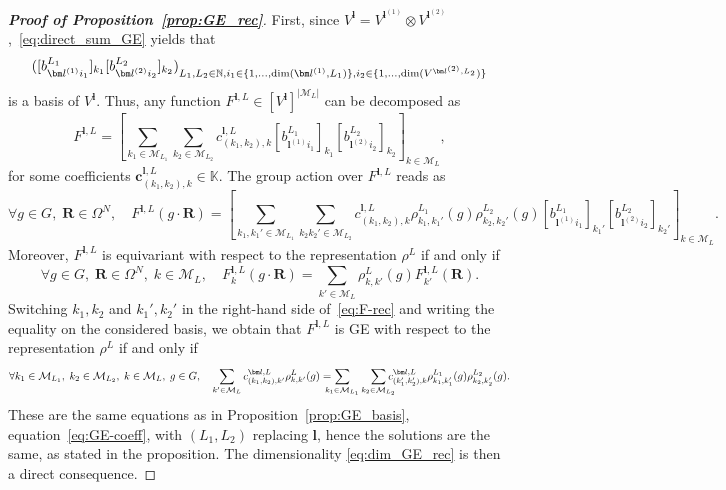 \documentclass{article}
\newcommand{\rep}[2]{\rho^{#1}_{#2}}
\newcommand{\card}[1]{|{#1}|}
\newcommand{\dimge}[2]{\dim(V^{#1,#2})}
\numberwithin{equation}{section}
\def\N{\mathbb{N}}
\def\K{\mathbb{K}}
\def\bc{{\bm c}}
\def\bl{{\bm l}}
\def\bR{{\bm R}}
\def\calM{\mathcal{M}}
\def\Nat{{N}}
\def\dim{{{\rm dim}}}
\begin{document}
\begin{proof}[\bf{Proof of Proposition~\ref{prop:GE_rec}}]
First, since $V^\bl = V^{\bl^{(1)}} \otimes V^{\bl^{(2)}}$,~\eqref{eq:direct_sum_GE} yields that
\[ 
([b^{L_1}_{\bl^{(1)} i_1}]_{k_1} [b^{L_2}_{\bl^{(2)} i_2}]_{k_2})_{L_1,L_2 \in \N, i_1 \in \{ 1, \ldots, \dim{}{}(\bl^{(1)},L_1)\}, i_2 \in \{1, \ldots, \dimge{\bl^{(2)}}{L_2}\} }
\]
is a basis of $V^\bl$. Thus, 
any function $F^{\bl,L}\in [V^\bl]^{\card{\calM_L}}$ can be decomposed as 
\[
F^{\bl,L}
   = \left[ \sum_{k_1 \in \calM_{L_1}} \sum_{k_2 \in \calM_{L_2}}
    c^{\bl,L}_{(k_1,k_2), k}
    [b^{L_1}_{\bl^{(1)} i_1}]_{k_1} [b^{L_2}_{\bl^{(2)} i_2}]_{k_2} \right]_{k\in \calM_L},
\]
for some coefficients $\bc^{\bl,L}_{(k_1,k_2), k} \in \K$.
The group action over $F^{\bl,L}$ reads as 
\begin{equation}\label{eq:F-rec}
   \forall g\in G, \; \bR\in \Omega^\Nat, \quad F^{\bl,L}(g \cdot \bR) = 
   \left[ \sum_{k_1, k_1'\in \calM_{L_1}} \sum_{k_2 k_2' \in \calM_{L_2}} 
    c^{\bl,L}_{(k_1,k_2), k}
    \rep{L_1}{k_1,k_1'}(g) \rep{L_2}{k_2,k_2'}(g)
    [b^{L_1}_{\bl^{(1)} i_1}]_{k_1'} [b^{L_2}_{\bl^{(2)} i_2}]_{k_2'} \right]_{k\in \calM_L}.
\end{equation}
Moreover, $F^{\bl,L}$ is equivariant with respect to the representation $\rep{L}{}$ if and only if
\[
    \forall g\in G,\; \bR\in\Omega^\Nat,\; k\in \calM_L, 
    \quad F^{\bl,L}_{k}(g \cdot \bR) = \sum_{k'\in\calM_L} \rep{L}{k,k'}(g)F_{k'}^{\bl,L}(\bR).
\]
Switching $k_1,k_2$ and $k_1',k_2'$ in the right-hand side of~\eqref{eq:F-rec} and writing the equality on the considered basis, we obtain that 
$F^{\bl,L}$ is GE with respect to the representation $\rep{L}{}$ if and only if
\begin{equation*}
    \forall k_1 \in \calM_{L_1},\; k_2 \in \calM_{L_2},\; k\in\calM_L,\; g\in G, \quad \sum_{k'\in\calM_L} c^{\bl,L}_{(k_1,k_2), k'} \rep{L}{k,k'}(g)  
   = \hspace{-3mm} \sum_{k_1 \in \calM_{L_1}} \sum_{k_2 \in \calM_{L_2}}
   \hspace{-3mm}
   c^{\bl,L}_{(k_1',k_2'), k} \rep{L_1}{k_1,k_1'}(g) \rep{L_2}{k_2,k_2'}(g). 
\end{equation*}
These are the same equations as in Proposition~\ref{prop:GE_basis}, equation~\eqref{eq:GE-coeff}, with $(L_1,L_2)$ replacing $\bl$, hence the solutions are the same, as stated in the proposition.
The dimensionality \eqref{eq:dim_GE_rec} is then a direct consequence.
\end{proof}
\end{document}
